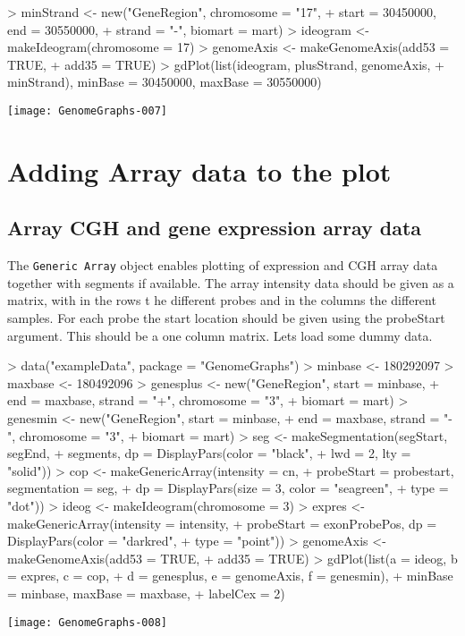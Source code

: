 \documentclass[11pt]{article}
\newcommand{\Robject}[1]{{\texttt{#1}}}
\begin{document}
\begin{Schunk}
\begin{Sinput}
> minStrand <- new("GeneRegion", chromosome = "17", 
+     start = 30450000, end = 30550000, 
+     strand = "-", biomart = mart)
> ideogram <- makeIdeogram(chromosome = 17)
> genomeAxis <- makeGenomeAxis(add53 = TRUE, 
+     add35 = TRUE)
> gdPlot(list(ideogram, plusStrand, genomeAxis, 
+     minStrand), minBase = 30450000, maxBase = 30550000)
\end{Sinput}
\end{Schunk}
\texttt{[image: GenomeGraphs-007]}

\section{Adding Array data to the plot}

\subsection{Array CGH and gene expression array data}
The \Robject{Generic Array} object enables plotting of expression and
CGH array data together with segments if available.  The array
intensity data should be given as a matrix, with in the rows t he
different probes and in the columns the different samples.  For each
probe the start location should be given using the probeStart
argument.  This should be a one column matrix.  Lets load some dummy
data.

\begin{Schunk}
\begin{Sinput}
> data("exampleData", package = "GenomeGraphs")
> minbase <- 180292097
> maxbase <- 180492096
> genesplus <- new("GeneRegion", start = minbase, 
+     end = maxbase, strand = "+", chromosome = "3", 
+     biomart = mart)
> genesmin <- new("GeneRegion", start = minbase, 
+     end = maxbase, strand = "-", chromosome = "3", 
+     biomart = mart)
> seg <- makeSegmentation(segStart, segEnd, 
+     segments, dp = DisplayPars(color = "black", 
+         lwd = 2, lty = "solid"))
> cop <- makeGenericArray(intensity = cn, 
+     probeStart = probestart, segmentation = seg, 
+     dp = DisplayPars(size = 3, color = "seagreen", 
+         type = "dot"))
> ideog <- makeIdeogram(chromosome = 3)
> expres <- makeGenericArray(intensity = intensity, 
+     probeStart = exonProbePos, dp = DisplayPars(color = "darkred", 
+         type = "point"))
> genomeAxis <- makeGenomeAxis(add53 = TRUE, 
+     add35 = TRUE)
> gdPlot(list(a = ideog, b = expres, c = cop, 
+     d = genesplus, e = genomeAxis, f = genesmin), 
+     minBase = minbase, maxBase = maxbase, 
+     labelCex = 2)
\end{Sinput}
\end{Schunk}
\texttt{[image: GenomeGraphs-008]}
\end{document}
